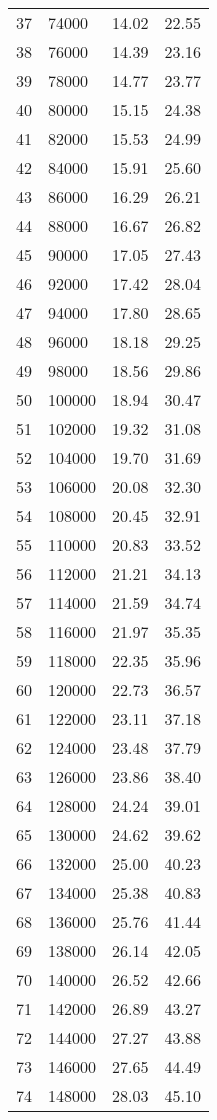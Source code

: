 \documentclass{article}
\begin{document}
\begin{longtable}{@{}l l l l}
37 & 74000 & 14.02 & 22.55\\
38 & 76000 & 14.39 & 23.16\\
39 & 78000 & 14.77 & 23.77\\
40 & 80000 & 15.15 & 24.38\\
41 & 82000 & 15.53 & 24.99\\
42 & 84000 & 15.91 & 25.60\\
43 & 86000 & 16.29 & 26.21\\
44 & 88000 & 16.67 & 26.82\\
45 & 90000 & 17.05 & 27.43\\
46 & 92000 & 17.42 & 28.04\\
47 & 94000 & 17.80 & 28.65\\
48 & 96000 & 18.18 & 29.25\\
49 & 98000 & 18.56 & 29.86\\
50 & 100000 & 18.94 & 30.47\\
51 & 102000 & 19.32 & 31.08\\
52 & 104000 & 19.70 & 31.69\\
53 & 106000 & 20.08 & 32.30\\
54 & 108000 & 20.45 & 32.91\\
55 & 110000 & 20.83 & 33.52\\
56 & 112000 & 21.21 & 34.13\\
57 & 114000 & 21.59 & 34.74\\
58 & 116000 & 21.97 & 35.35\\
59 & 118000 & 22.35 & 35.96\\
60 & 120000 & 22.73 & 36.57\\
61 & 122000 & 23.11 & 37.18\\
62 & 124000 & 23.48 & 37.79\\
63 & 126000 & 23.86 & 38.40\\
64 & 128000 & 24.24 & 39.01\\
65 & 130000 & 24.62 & 39.62\\
66 & 132000 & 25.00 & 40.23\\
67 & 134000 & 25.38 & 40.83\\
68 & 136000 & 25.76 & 41.44\\
69 & 138000 & 26.14 & 42.05\\
70 & 140000 & 26.52 & 42.66\\
71 & 142000 & 26.89 & 43.27\\
72 & 144000 & 27.27 & 43.88\\
73 & 146000 & 27.65 & 44.49\\
74 & 148000 & 28.03 & 45.10\\

\end{longtable}
\end{document}
